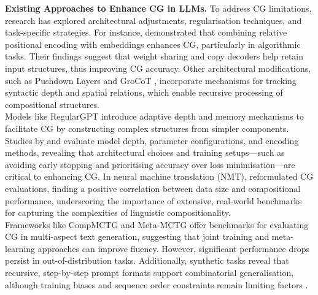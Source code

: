\textbf{Existing Approaches to Enhance CG in LLMs.} To address CG limitations, research has explored architectural adjustments, regularisation techniques, and task-specific strategies. For instance, \cite{ontanon-etal-2022-making} demonstrated that combining relative positional encoding with embeddings enhances CG, particularly in algorithmic tasks. Their findings suggest that weight sharing and copy decoders help retain input structures, thus improving CG accuracy. Other architectural modifications, such as Pushdown Layers \cite{murty-etal-2023-pushdown} and GroCoT \cite{sikarwar-etal-2022-transformers}, incorporate mechanisms for tracking syntactic depth and spatial relations, which enable recursive processing of compositional structures.\\
Models like RegularGPT \cite{chi-etal-2023-transformer} introduce adaptive depth and memory mechanisms to facilitate CG by constructing complex structures from simpler components. Studies by \cite{csordas-etal-2021-devil} and \cite{petty2024impact} evaluate model depth, parameter configurations, and encoding methods, revealing that architectural choices and training setups—such as avoiding early stopping and prioritising accuracy over loss minimisation—are critical to enhancing CG. In neural machine translation (NMT), \cite{dankers2022paradox} reformulated CG evaluations, finding a positive correlation between data size and compositional performance, underscoring the importance of extensive, real-world benchmarks for capturing the complexities of linguistic compositionality.\\
Frameworks like CompMCTG and Meta-MCTG \cite{zhong2024benchmarking} offer benchmarks for evaluating CG in multi-aspect text generation, suggesting that joint training and meta-learning approaches can improve fluency. However, significant performance drops persist in out-of-distribution tasks. Additionally, synthetic tasks reveal that recursive, step-by-step prompt formats support combinatorial generalisation, although training biases and sequence order constraints remain limiting factors \cite{ramesh2024compositional}.